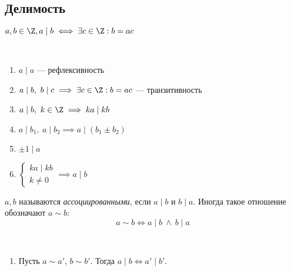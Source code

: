 \subsection{Делимость}

\begin{defn}
    $a, b \in \Z, a \mid b \iff \exists c \in \Z: b = ac$
\end{defn}

\begin{prop}~

    \begin{enumerate}
        \item $a \mid a$ --- рефлексивность
        
        \item $a \mid b,~b \mid c \implies \exists c \in \Z: b = ac$ --- транзитивность
        
        \item $a \mid b,~k \in \Z \implies ka \mid kb$ 
        
        \item $a \mid b_1,~a \mid b_2 \implies a \mid (b_1 \pm b_2)$
        
        \item $\pm1 \mid a$
        
        \item $\begin{cases} ka \mid kb \\ k \neq 0 \end{cases} \implies a \mid b$
    \end{enumerate}
\end{prop}


\begin{defn}
    $a, b$ называются \emph{ассоциированными}, если $a \mid b$ и $b \mid a$.
    Иногда такое отношение обозначают $a \sim b$:
    \[ a \sim b \iff a \mid b \ \wedge\ b \mid a \]
\end{defn}

\begin{prop}~
    \begin{enumerate}
        \item Пусть $a \sim a'$, $ b \sim b'$. Тогда $a \mid b \iff a' \mid b'$.
    \end{enumerate}
\end{prop}